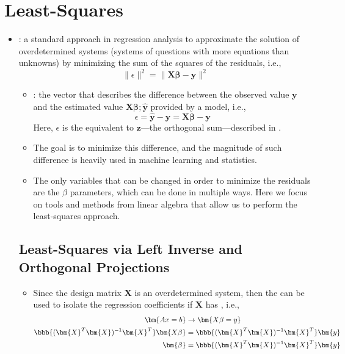 \section{Least-Squares}\label{Least-Squares}
\begin{itemize}
  \item {}: a standard approach in regression analysis to approximate the solution of overdetermined systems (systems of questions with more equations than unknowns) by minimizing the sum of the squares of the residuals, i.e.,
  \[%
  \| \epsilon \|^2 = \| \bm{X\beta - y}\|^2
  \]%
    \begin{itemize}
      \item {}: the vector that describes the difference between the observed value \(\bm{y}\) and the estimated value \(\bm{X\beta}; \bm{\hat{y}}\) provided by a model, i.e.,
      \[%
      \epsilon = \bm{\hat{y}} - \bm{y} = \bm{X\beta - y}
      \]%
      Here, \(\epsilon\) is the equivalent to \(\bm{z}\)---the orthogonal sum---described in \hyperref[Finding Projections]{}.
      \item The goal is to minimize this difference, and the magnitude of such difference is heavily used in machine learning and statistics. 
      \item The only variables that can be changed in order to minimize the residuals are the \(\beta \) parameters, which can be done in multiple ways. Here we focus on tools and methods from linear algebra that allow us to perform the least-squares approach.
    \end{itemize}

  \subsection{Least-Squares via Left Inverse and Orthogonal Projections}\label{Least-Squares via Left Inverse}
  \begin{itemize}
    \item Since the design matrix \(\bm{X}\) is an overdetermined system, then the \hyperref[Inverse Basics]{} can be used to isolate the regression coefficients if \(\bm{X}\) has \hyperref[Maximum Rank]{}, i.e.,
    \begin{align*}
      \bm{Ax = b} &\to \bm{X\beta = y} \\
      \bbb{(\bm{X}^T \bm{X})^{-1} \bm{X}^T} \bm{X\beta} &= \bbb{(\bm{X}^T \bm{X})^{-1} \bm{X}^T} \bm{y} \\
      \bm{\beta} &= \bbb{(\bm{X}^T \bm{X})^{-1} \bm{X}^T} \bm{y}
    \end{align*}


\end{itemize}
\end{itemize}
